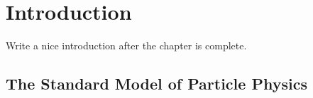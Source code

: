 
\chapter{Introduction}
\label{Introduction}

{\color{red} Write a nice introduction after the chapter is complete.}

%
%

\section{The Standard Model of Particle Physics}
\label{The_Standard_Model}



